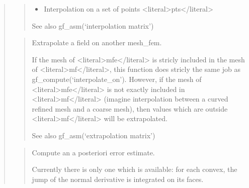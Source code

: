 \documentclass[a4paper,11pt,english]{sphinxmanual}
\begin{document}
\begin{quote}
\begin{quote}
\begin{itemize}
\begin{description}
\end{description}

\item {} 
\sphinxAtStartPar
Interpolation on a set of points \textless{}literal\textgreater{}pts\textless{}/literal\textgreater{}

\end{itemize}

\sphinxAtStartPar
See also gf\_asm(‘interpolation matrix’)
\end{quote}

\sphinxAtStartPar
{}
\begin{quote}

\sphinxAtStartPar
Extrapolate a field on another mesh\_fem.

\sphinxAtStartPar
If the mesh of \textless{}literal\textgreater{}mfe\textless{}/literal\textgreater{} is stricly included in the mesh of \textless{}literal\textgreater{}mf\textless{}/literal\textgreater{}, this
function does stricly the same job as gf\_compute(‘interpolate\_on’).
However, if the mesh of \textless{}literal\textgreater{}mfe\textless{}/literal\textgreater{} is not exactly included in \textless{}literal\textgreater{}mf\textless{}/literal\textgreater{}
(imagine interpolation between a curved refined mesh and a coarse
mesh), then values which are outside \textless{}literal\textgreater{}mf\textless{}/literal\textgreater{} will be
extrapolated.

\sphinxAtStartPar
See also gf\_asm(‘extrapolation matrix’)
\end{quote}

\sphinxAtStartPar
{}
\begin{quote}

\sphinxAtStartPar
Compute an a posteriori error estimate.

\sphinxAtStartPar
Currently there is only one which is available: for each convex,
the jump of the normal derivative is integrated on its faces.
\end{quote}

\sphinxAtStartPar
{}
\begin{quote}


\end{quote}
\end{quote}
\end{document}
